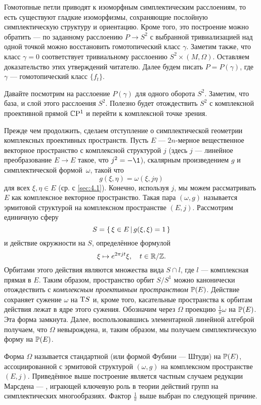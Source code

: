 Гомотопные петли приводят к изоморфным симплектическим расслоениям, то
есть существуют гладкие изоморфизмы, сохраняющие послойную
симплектическую структуру и ориентацию.
Кроме того, это построение можно обратить — по заданному расслоению
$P \to S^2$ с выбранной тривиализацией над одной точкой можно
восстановить гомотопический класс $\gamma$.
Заметим также, что класс $\gamma = 0$ соответствует тривиальному
расслоению $S^2 \times (M, \Omega)$.
Оставляем доказательство этих утверждений читателю.
Далее будем писать $P = P(\gamma)$, где $\gamma$ — гомотопический класс
$\{f_t\}$.

Давайте посмотрим на расслоение $P(\gamma)$ для одного оборота $S^2$.
Заметим, что база, и слой этого расслоения $S^2$.
Полезно будет отождествить $S^2$ с комплексной проективной прямой
$\mathbb{C}\mathrm{P}^1$ и перейти к комплексной точке зрения.

Прежде чем продолжить, сделаем отступление о симплектической геометрии
комплексных проективных пространств. 
Пусть $E$ — $2n$-мерное вещественное векторное пространство с
комплексной структурой $j$ 
(здесь $j$ — линейное преобразование $E\to E$ такое, что $j^2 = -\1$),
скалярным произведением $g$ и симплектической формой~$\omega$, такой что
\[g(\xi, \eta ) = \omega(\xi, j\eta)\]
для всех $\xi, \eta \in E$ (ср. с \ref{sec:4.1}).
Конечно, используя $j$, мы можем рассматривать $E$ как комплексное
векторное пространство. 
Такая пара $(\omega, g)$ называется эрмитовой структурой на
комплексном пространстве $(E, j)$.
Рассмотрим единичную сферу
\[S = \left\{ \,{\xi \in E}\, \middle| \,{g(\xi, \xi) = 1}\, \right\}\]
и действие окружности на $S$, определённое формулой 
\[\xi \mapsto e^{2\pi jt} \xi,\quad t \in \mathbb{R}/\mathbb{Z}.\]
Орбитами этого действия являются множества вида $S \cap l$, где $l$ — комплексная прямая в $E$. 
Таким образом, пространство орбит $S/S^1$ можно канонически отождествить с \emph{комплексным проективным пространством} $\mathbb{P}(E)$.
Действие сохраняет сужение $\omega$ на $\mathrm{T} S$ и, кроме того, касательные пространства к орбитам действия лежат в ядре этого сужения.
Обозначим через $\Omega$ проекцию $\tfrac1\pi \omega$ на $\mathbb{P}(E)$.
Эта форма замкнута.
Далее, воспользовавшись элементарной линейной алгеброй получаем, что $\Omega$ невырождена, и, таким образом, мы получаем симплектическую форму на $\mathbb{P}(E)$. 

Форма $\Omega$ называется стандартной (или формой Фубини — Штуди) на $\mathbb{P}(E)$, ассоциированной с эрмитовой структурой $(\omega, g)$ на комплексном пространстве $(E, j)$.
Приведённое выше построение является частным случаем редукции Марсдена —  \cite{MS}, играющей ключевую роль в теории действий
групп на симплектических многообразиях.
Фактор $\tfrac1\pi$ выше выбран по следующей причине.

